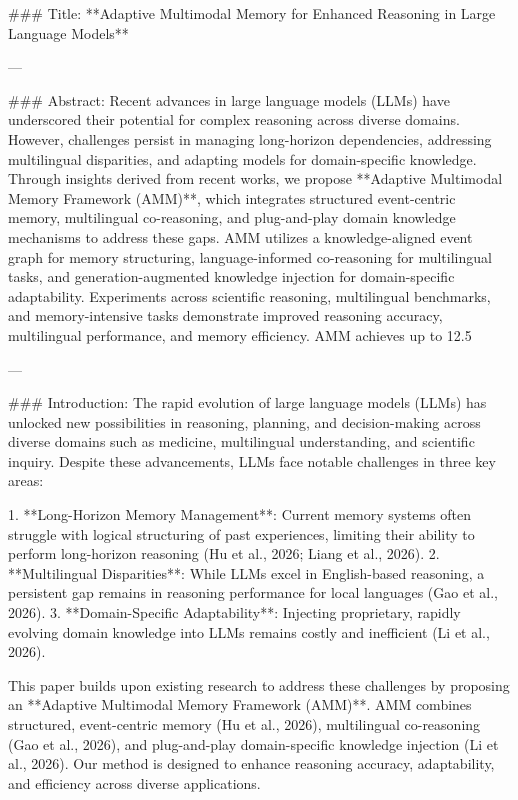 ### Title:
**Adaptive Multimodal Memory for Enhanced Reasoning in Large Language Models**

---

### Abstract:
Recent advances in large language models (LLMs) have underscored their potential for complex reasoning across diverse domains. However, challenges persist in managing long-horizon dependencies, addressing multilingual disparities, and adapting models for domain-specific knowledge. Through insights derived from recent works, we propose **Adaptive Multimodal Memory Framework (AMM)**, which integrates structured event-centric memory, multilingual co-reasoning, and plug-and-play domain knowledge mechanisms to address these gaps. AMM utilizes a knowledge-aligned event graph for memory structuring, language-informed co-reasoning for multilingual tasks, and generation-augmented knowledge injection for domain-specific adaptability. Experiments across scientific reasoning, multilingual benchmarks, and memory-intensive tasks demonstrate improved reasoning accuracy, multilingual performance, and memory efficiency. AMM achieves up to 12.5%

---

### Introduction:
The rapid evolution of large language models (LLMs) has unlocked new possibilities in reasoning, planning, and decision-making across diverse domains such as medicine, multilingual understanding, and scientific inquiry. Despite these advancements, LLMs face notable challenges in three key areas:

1. **Long-Horizon Memory Management**: Current memory systems often struggle with logical structuring of past experiences, limiting their ability to perform long-horizon reasoning (Hu et al., 2026; Liang et al., 2026).
2. **Multilingual Disparities**: While LLMs excel in English-based reasoning, a persistent gap remains in reasoning performance for local languages (Gao et al., 2026).
3. **Domain-Specific Adaptability**: Injecting proprietary, rapidly evolving domain knowledge into LLMs remains costly and inefficient (Li et al., 2026).

This paper builds upon existing research to address these challenges by proposing an **Adaptive Multimodal Memory Framework (AMM)**. AMM combines structured, event-centric memory (Hu et al., 2026), multilingual co-reasoning (Gao et al., 2026), and plug-and-play domain-specific knowledge injection (Li et al., 2026). Our method is designed to enhance reasoning accuracy, adaptability, and efficiency across diverse applications.

